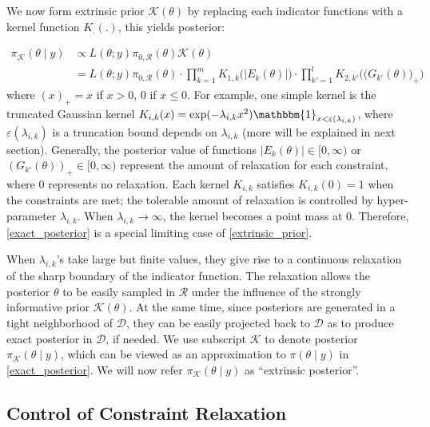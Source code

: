 \documentclass[10pt]{article}
\newcommand{\mc}[1]{\mathcal{#1}}
\DeclareMathOperator{\1}{\mathbbm{1}}
\begin{document}
We now form extrinsic prior $\mc K(\theta)$ by replacing each indicator functions with a kernel function $K_.(.)$, this yields posterior:

\begin{equation}
\begin{aligned}
\label{extrinsic_prior}
\pi_{\mc K}(\theta \mid y) & \propto L(\theta;y)\pi_{0,\mc R}(\theta) \mc K(\theta) \\
&= L(\theta;y)\pi_{0,\mc R}(\theta) \cdot \prod_{k=1}^{m} K_{1,k}\Big( | E_k(\theta)| \Big) \cdot \prod_{k'=1}^{l} K_{2,k'}\Big( \big( G_{k'}(\theta) \big)_+ \Big)
\end{aligned}
\end{equation}
where $(x)_+ = x$ if $x>0$, $0$ if $x\le 0$. For example, one simple kernel is the truncated Gaussian kernel $K_{i,k}(x) = \exp( -{\lambda_{i,k} x^2}) \mathbbm{1}_{x<\varepsilon(\lambda_{i,k})}$, where $\varepsilon(\lambda_{i,k})$ is a truncation bound depends on $\lambda_{i,k}$ (more will be explained in next section). Generally, the posterior value of functions $|E_k(\theta)|\in [0,\infty)$ or $(G_{k'}(\theta))_+ \in [0,\infty)$ represent the amount of relaxation for each constraint, where $0$ represents no relaxation. Each kernel $K_{i,k}$ satisfies $K_{i,k}(0)=1$ when the constraints are met; the tolerable amount of relaxation is controlled by hyper-parameter $\lambda_{i,k}$. When $\lambda_{i,k} \rightarrow \infty$, the kernel becomes a point mass at $0$. Therefore, \eqref{exact_posterior} is a special limiting case of \eqref{extrinsic_prior}.

When $\lambda_{i,k}$'s take large but finite values, they give rise to a continuous relaxation of the sharp boundary of the indicator function. The relaxation allows the posterior $\theta$ to be easily sampled in $\mc R$ under the influence of the strongly informative prior $\mc K(\theta)$. At the same time, since posteriors are generated in a tight neighborhood of $\mc D$, they can be easily projected back to $\mc D$ as to produce exact posterior in $\mc D$, if needed. We use subscript $\mc K$ to denote posterior $\pi_{\mc K}(\theta \mid y)$, which can be viewed as an approximation to $\pi(\theta \mid y)$ in \eqref{exact_posterior}. We will now refer $\pi_{\mc K}(\theta \mid y)$ as ``extrinsic posterior''.

\subsection{Control of Constraint Relaxation}
\end{document}
